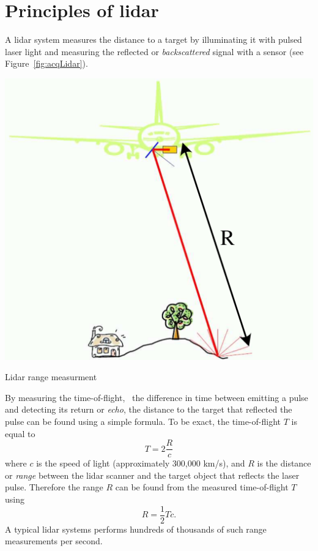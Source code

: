 \section{Principles of lidar}%
\label{sec:lidar-principles}

A lidar system measures the distance to a target by illuminating it with pulsed laser light and measuring the reflected or \emph{backscattered} signal with a sensor (see Figure~\ref{fig:acqLidar}). 
\begin{marginfigure}
	\centering
	\includegraphics[width=\textwidth]{figs/lidar.png}
	\caption{Lidar range measurment}%
	\label{fig:acqLidar}
\end{marginfigure}
By measuring the time-of-flight, \ie\ the difference in time between emitting a pulse and detecting its return or \emph{echo}, the distance to the target that reflected the pulse can be found using a simple formula. To be exact, the time-of-flight $T$ is equal to
\begin{equation}
	\label{eq:tof}
	T= 2 \frac{R}{c}
\end{equation}
where $c$ is the speed of  light (approximately 300,000 km/s), and $R$ is the distance or \emph{range} between the lidar scanner and the target object that reflects the laser pulse. Therefore the range $R$ can be found from the measured time-of-flight $T$ using
\begin{equation*}
	R = \frac{1}{2} Tc.
\end{equation*}
A typical lidar systems performs hundreds of thousands of such range measurements per second. 

